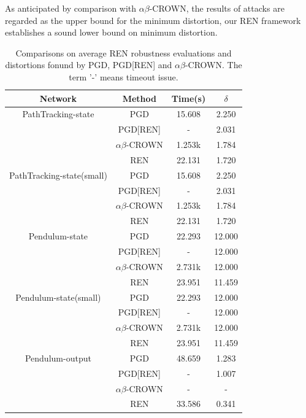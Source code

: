\documentclass[conference]{IEEEtran}
\newcommand{\abcrown}{$\alpha\beta$-CROWN\xspace}
\newcommand{\ren}{\textsc{REN}\xspace}
\begin{document}
As anticipated by comparison with \abcrown, 
the results of attacks are 
regarded as the upper bound for 
the minimum distortion, 
our \ren framework establishes a sound 
lower bound on minimum distortion. 
\begin{table}[htbp]
    \caption{Comparisons on average \ren robustness evaluations 
    and distortions fonund by PGD, PGD[\ren] and \abcrown. The term '-' 
    means timeout issue. }
    \label{table:comparison}
    \begin{center}
      \begin{tabular}{|c|c|c|c|}
        \hline
        \textbf{Network} & Method & Time(s) & $\delta$\\
        \hline
        PathTracking-state & PGD & 15.608 & 2.250 \\
        & PGD[\ren] & - & 2.031 \\
        & \abcrown & 1.253k & 1.784 \\
        & \ren & 22.131 & 1.720 \\
        \hline
        PathTracking-state(small) & PGD & 15.608 & 2.250 \\
        & PGD[\ren] & - & 2.031 \\
        & \abcrown & 1.253k & 1.784 \\
        & \ren & 22.131 & 1.720 \\
        \hline
        Pendulum-state & PGD & 22.293 & 12.000 \\
        & PGD[\ren] & - & 12.000 \\
        & \abcrown & 2.731k & 12.000 \\
        & \ren & 23.951 & 11.459 \\
        \hline
        Pendulum-state(small) & PGD & 22.293 & 12.000 \\
        & PGD[\ren] & - & 12.000 \\
        & \abcrown & 2.731k & 12.000 \\
        & \ren & 23.951 & 11.459 \\
        \hline
        Pendulum-output & PGD & 48.659& 1.283 \\
        & PGD[\ren] & - & 1.007 \\
        & \abcrown & - & - \\
        & \ren & 33.586 & 0.341 \\

\end{tabular}
\end{center}
\end{table}
\end{document}
